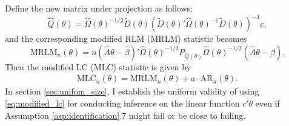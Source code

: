 \documentclass[11pt]{article}
\theoremstyle{definition}
\newcommand{\0}{\ensuremath{\mathbf{0}}}
\begin{document}
\begin{bibunit}
Define the new matrix under projection as follows:
%
%
%
%
\[
    \hat{Q}(\theta) = \hat{\Omega}(\theta)^{-1/2}\widetilde{D}(\theta)(\widetilde{D}(\theta)'\hat{\Omega}(\theta)^{-1}\widetilde{D}(\theta))^{-1}c,
\]
and the corresponding modified RLM (MRLM) statistic becomes
\[
    \text{MRLM}_n(\theta) = n(\hat{A}\theta - \hat{\beta})' \hat{\Omega}(\theta)^{-1/2} P_{\hat{Q}(\theta)} \hat{\Omega}(\theta)^{-1/2}(\hat{A}\theta - \hat{\beta}).
\]
Then the modified LC (MLC) statistic is given by
\begin{align}
	\text{MLC}_n(\theta) 
		= \text{MRLM}_n(\theta) + a \cdot \text{AR}_n(\theta). \label{eq:modified_lc}
\end{align}
In section \ref{sec:unifom_size}, I establish the uniform validity of using \eqref{eq:modified_lc} for conducting inference on the linear function $c'\theta$ even if Assumption \ref{asp:identification}.7 might fail or be close to failing. 


\end{bibunit}
\end{document}
